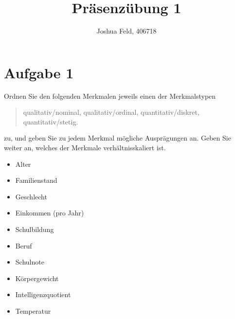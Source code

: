 \documentclass{exercise}
\institute{Institut für Statistik und Wirtschaftsmathematik}
\title{Präsenzübung 1}
\author{Joshua Feld, 406718}
\begin{document}
    \maketitle


    \section*{Aufgabe 1}

    \begin{problem}
        Ordnen Sie den folgenden Merkmalen jeweils einen der Merkmalstypen
        \begin{quote}
            qualitativ/nominal, qualitativ/ordinal, quantitativ/diskret, quantitativ/stetig.
        \end{quote}
        zu, und geben Sie zu jedem Merkmal mögliche Ausprägungen an.
        Geben Sie weiter an, welches der Merkmale verhältnisskaliert ist.
        \begin{itemize}
            \item Alter
            \item Familienstand
            \item Geschlecht
            \item Einkommen (pro Jahr)
            \item Schulbildung
            \item Beruf
            \item Schulnote
            \item Körpergewicht
            \item Intelligenzquotient
            \item Temperatur
        \end{itemize}
    \end{problem}
    
\end{document}
